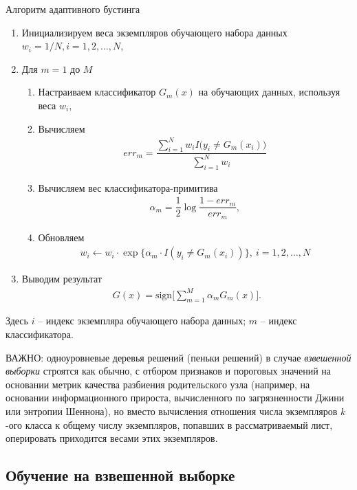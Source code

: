 \documentclass[%
	11pt,
	a4paper,
	utf8,
		]{article}
\begin{document}
Алгоритм адаптивного бустинга
\begin{enumerate}
	\item Инициализируем веса экземпляров обучающего набора данных $ w_i = 1/N, i = 1, 2, \ldots, N $,
	
	\item Для $ m = 1 $ до $ M $
	\begin{enumerate}
		\item Настраиваем классификатор $ G_m(x) $ на обучающих данных, используя веса $ w_i $,
		
		\item Вычисляем
\begin{align*}
	err_m = \dfrac{ \sum\limits_{i=1}^{N} w_i I\big(y_i \neq G_m(x_i)\big) }{ \sum\limits_{i=1}^{N} w_i}
\end{align*}

        \item Вычисляем вес классификатора-примитива
\begin{align*}
	\alpha_m = \dfrac{1}{2} \log \dfrac{ 1- err_m }{ err_m },
\end{align*}

        \item Обновляем
\begin{align*}
	w_i \leftarrow w_i \cdot \exp \{ \alpha_m \cdot I(y_i \neq G_m(x_i)) \}, \ i = 1, 2, \ldots, N
\end{align*}
	\end{enumerate}

    \item Выводим результат
\begin{align*}
	G(x) = \text{sign} \big[ \sum_{m=1}^{M} \alpha_m G_m(x) \big].
\end{align*}
\end{enumerate}

Здесь $ i $ -- индекс экземпляра обучающего набора данных; $ m $ -- индекс классификатора.

ВАЖНО: одноуровневые деревья решений (пеньки решений) в случае \emph{взвешенной выборки} строятся как обычно, с отбором признаков и пороговых значений на основании метрик качества разбиения родительского узла (например, на основании информационного прироста, вычисленного по загрязненности Джини или энтропии Шеннона), но вместо вычисления отношения числа экземпляров $ k $-ого класса к общему числу экземпляров, попавших в рассматриваемый лист, оперировать приходится весами этих экземпляров.

\subsection{Обучение на взвешенной выборке}
\end{document}
